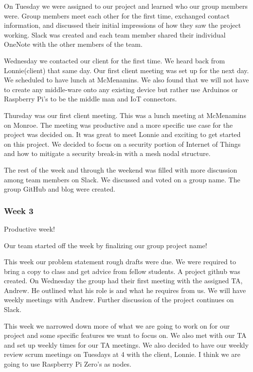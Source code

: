 \documentclass[draftclsnofoot, onecolumn, compsoc, 10pt]{IEEEtran}
\begin{document}
On Tuesday we were assigned to our project and learned who our group members were. Group members meet each other for the first time, exchanged contact information, and discussed their initial impressions of how they saw the project working. Slack was created and each team member shared their individual OneNote with the other members of the team.

Wednesday we contacted our client for the first time. We heard back from Lonnie(client) that same day. Our first client meeting was set up for the next day. We scheduled to have lunch at McMenamins. We also found that we will not have to create any middle-ware onto any existing device but rather use Arduinos or Raspberry Pi's to be the middle man and IoT connectors.

Thursday was our first client meeting. This was a lunch meeting at McMenamins on Monroe. The meeting was productive and a more specific use case for the project was decided on. It was great to meet Lonnie and exciting to get started on this project. We decided to focus on a security portion of Internet of Things and how to mitigate a security break-in with a mesh nodal structure. 

The rest of the week and through the weekend was filled with more discussion among team members on Slack. We discussed and voted on a group name. The group GitHub and blog were created.

\subsubsection{Week 3}
Productive week!

Our team started off the week by finalizing our group project name! 

This week our problem statement rough drafts were due. We were required to bring a copy to class and get advice from fellow students. A project github was created. On Wednesday the group had their first meeting with the assigned TA, Andrew. He outlined what his role is and what he requires from us. We will have weekly meetings with Andrew. Further discussion of the project continues on Slack. 

This week we narrowed down more of what we are going to work on for our project and some specific features we want to focus on. We also met with our TA and set up weekly times for our TA meetings. We also decided to have our weekly review scrum meetings on Tuesdays at 4 with the client, Lonnie. I think we are going to use Raspberry Pi Zero's as nodes.  
\end{document}
